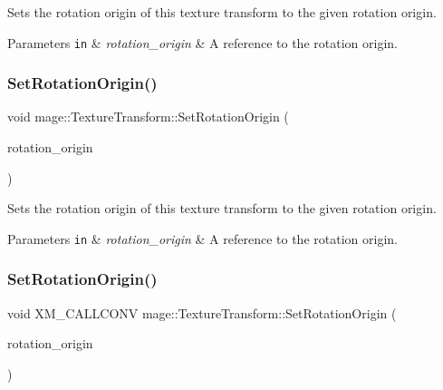 Sets the rotation origin of this texture transform to the given rotation origin.


\begin{DoxyParams}[1]{Parameters}
\mbox{\tt in}  & {\em rotation\+\_\+origin} & A reference to the rotation origin. \\
\hline
\end{DoxyParams}
\hypertarget{classmage_1_1_texture_transform_a82e94cf27ae9739bac742f794910e199}{}\label{classmage_1_1_texture_transform_a82e94cf27ae9739bac742f794910e199} 
\subsubsection{\texorpdfstring{Set\+Rotation\+Origin()}{SetRotationOrigin()}\hspace{0.1cm}{\footnotesize\ttfamily [3/4]}}
{\footnotesize\ttfamily void mage\+::\+Texture\+Transform\+::\+Set\+Rotation\+Origin (\begin{DoxyParamCaption}\item[{X\+M\+F\+L\+O\+A\+T2 \&\&}]{rotation\+\_\+origin }\end{DoxyParamCaption})\hspace{0.3cm}{\ttfamily [noexcept]}}

Sets the rotation origin of this texture transform to the given rotation origin.


\begin{DoxyParams}[1]{Parameters}
\mbox{\tt in}  & {\em rotation\+\_\+origin} & A reference to the rotation origin. \\
\hline
\end{DoxyParams}
\hypertarget{classmage_1_1_texture_transform_a41aebcbc263a678157081986a72f52af}{}\label{classmage_1_1_texture_transform_a41aebcbc263a678157081986a72f52af} 
\subsubsection{\texorpdfstring{Set\+Rotation\+Origin()}{SetRotationOrigin()}\hspace{0.1cm}{\footnotesize\ttfamily [4/4]}}
{\footnotesize\ttfamily void X\+M\+\_\+\+C\+A\+L\+L\+C\+O\+NV mage\+::\+Texture\+Transform\+::\+Set\+Rotation\+Origin (\begin{DoxyParamCaption}\item[{F\+X\+M\+V\+E\+C\+T\+OR}]{rotation\+\_\+origin }\end{DoxyParamCaption})\hspace{0.3cm}{\ttfamily [noexcept]}}

